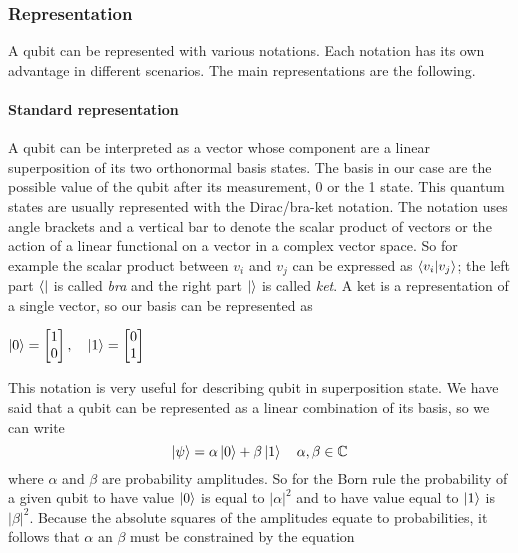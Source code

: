\documentclass[main.tex]{subfiles}
\theoremstyle{definition}
\begin{document}
		\subsubsection{Representation}
		A qubit can be represented with various notations. Each notation has its own advantage in different scenarios. 
		The main representations are the following.
		\paragraph{Standard representation}
		A qubit can be interpreted as a vector whose component are a linear superposition of its two orthonormal basis states. 
		The	basis in our case are the possible value of the qubit after its measurement, 0 or the 1 state. 
		This quantum states are usually represented with the Dirac/bra-ket notation.
		The notation uses angle brackets and a vertical bar to denote the scalar product of vectors or the action of a linear 
		functional on a vector in a complex vector space. So for example the scalar product between $v_i$ and $v_j$ can be expressed
	 	as $\braket{v_i|v_j}$; the left part $\bra{}$ is called \textit{bra} and the right part $\ket{}$ is called \textit{ket}. A
	 	ket is a representation of a single vector, so our basis can be represented as 
		\begin{center}
		$\ket{0} = 
		\begin{bmatrix}
           1 \\
           0
        \end{bmatrix},\quad
        \ket{1} = 
		\begin{bmatrix}
           0 \\
           1
        \end{bmatrix}$
		\end{center}
       	This notation is very useful for describing qubit in superposition state. We have said that a qubit can be 
        represented as a linear combination of its basis, so we can write 
      	\begin{equation}
        \ket{\psi}=\alpha\ket{0}+\beta\ket{1} 
        \quad \alpha, \beta \in \mathbb{C}
        \end{equation}
        where $\alpha$ and $\beta$ are probability amplitudes. So for the Born rule the probability of a given qubit to have 
        value $\ket{0}$ is equal to $|\alpha|^2$
        and to have value equal to $\ket{1}$ is $|\beta|^2$. Because the absolute squares of the amplitudes equate to probabilities,
        it follows that $\alpha$ an $\beta$ must be constrained by the equation
\end{document}
